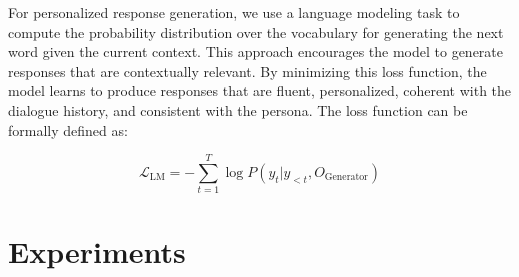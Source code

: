 \documentclass[letterpaper]{article} %
\begin{document}

For personalized response generation, we use a language modeling task to compute the probability distribution over the vocabulary for generating the next word given the current context. This approach encourages the model to generate responses that are contextually relevant. By minimizing this loss function, the model learns to produce responses that are fluent, personalized, coherent with the dialogue history, and consistent with the persona. The loss function can be formally defined as:

\begin{equation}
    \mathcal{L}_{\text{LM}} = - \sum_{t=1}^{T} \log P(y_t | y_{<t}, O_{\text{Generator}})
\end{equation}

\section{Experiments}
\end{document}
